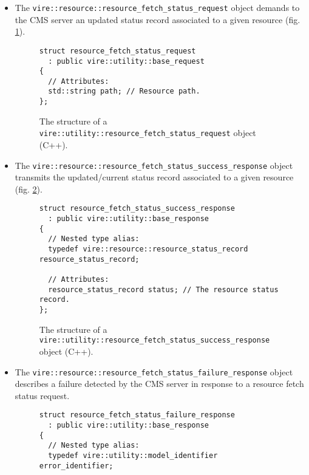 \begin{itemize}

\item The \texttt{vire::resource::resource\_fetch\_status\_request} object
  demands to the CMS server an updated status record associated to a given resource
(fig. \ref{fig-app-payload-resource_fetch_status_request}).

\begin{figure}[h]
\vskip 10pt
\small
\begin{Verbatim}[frame=single,xleftmargin=0.cm,label=\fbox{C++}]
struct resource_fetch_status_request
  : public vire::utility::base_request
{
  // Attributes:
  std::string path; // Resource path.
};
\end{Verbatim}
\normalsize
\caption{The structure of a \texttt{vire::utility::resource\_fetch\_status\_request} object
  (C++).}
\label{fig-app-payload-resource_fetch_status_request}
\end{figure}

\item The \texttt{vire::resource::resource\_fetch\_status\_success\_response} object
  transmits the updated/current status record  associated to a given resource
(fig. \ref{fig-app-payload-resource_fetch_status_success_response}).

\begin{figure}[h]
\vskip 10pt
\small
\begin{Verbatim}[frame=single,xleftmargin=0.cm,label=\fbox{C++}]
struct resource_fetch_status_success_response
  : public vire::utility::base_response
{
  // Nested type alias:
  typedef vire::resource::resource_status_record resource_status_record;

  // Attributes:
  resource_status_record status; // The resource status record.
};
\end{Verbatim}
\normalsize
\caption{The structure of a \texttt{vire::utility::resource\_fetch\_status\_success\_response} object
  (C++).}
\label{fig-app-payload-resource_fetch_status_success_response}
\end{figure}



\item The \texttt{vire::resource::resource\_fetch\_status\_failure\_response} object
  describes a failure detected by the CMS server in response to a resource fetch status request.

\begin{figure}[h]
\vskip 10pt
\small
\begin{Verbatim}[frame=single,xleftmargin=0.cm,label=\fbox{C++}]
struct resource_fetch_status_failure_response
  : public vire::utility::base_response
{
  // Nested type alias:
  typedef vire::utility::model_identifier error_identifier;


\end{Verbatim}
\end{figure}
\end{itemize}
